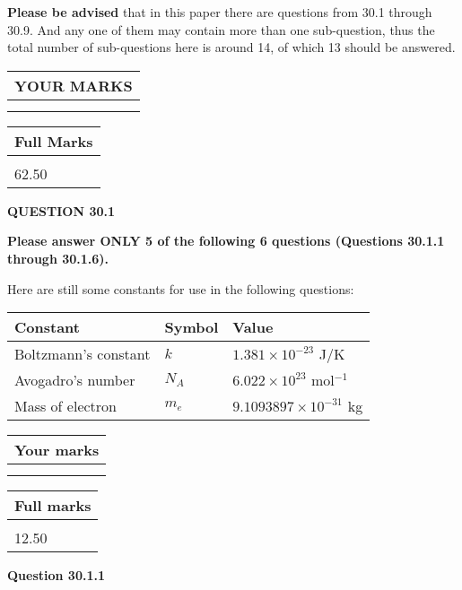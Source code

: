 \documentclass[12pt]{article}
\begin{document}
 
{\textbf{\large{Please be advised}}} that in this paper there are questions from
30.1 through
30.9.
And any one of them may contain more than one sub-question, thus the total number
of sub-questions here is around 14, of which
13 should be answered.
 
\vspace{0.3in}
 
 
   
   
  
\vspace{0.2in}
  
\noindent\begin{tabular}{|l|}
\hline
 YOUR MARKS  \\
\hline
 \\ 
 \\ 
\hline
\end{tabular}
\hspace{0.05in} \begin{tabular}{|l|}
\hline
 Full Marks  \\
\hline
 \\ 
62.50 \\
\hline
\end{tabular}
{\textbf{\Large{QUESTION
30.1 
}}}
  
  
 
{\textbf{\Large{Please answer ONLY
5 of the following
6 questions (Questions
30.1.1 through
30.1.6). }}}
 
Here are still some constants for use in the following questions:
 
 
\noindent\begin{tabular}{|l|l|l|}
\hline
Constant & Symbol & Value \\
\hline
 
Boltzmann's constant &
$k$ &
 $ 1.381 \times 10^{-23} $
J/K \\
\hline
 
Avogadro's number &
$N_A$ &
 $ 6.022 \times 10^{23} $
mol$^{-1}$ \\
\hline
 
Mass of electron &
$m_e$ &
 $ 9.1093897 \times 10^{-31} $
kg \\
\hline
 
\end{tabular}
 
  
\vspace{0.2in}
  
         \begin{tabular}{|l|}
\hline
 Your marks  \\
\hline
 \\ 
 \\ 
\hline
\end{tabular}
\hspace{0.05in} \begin{tabular}{|l|}
\hline
 Full marks  \\
\hline
 \\ 
12.50 \\
\hline
\end{tabular}
{\textbf{\Large{Question
30.1.1 
}}}
  
\end{document}
